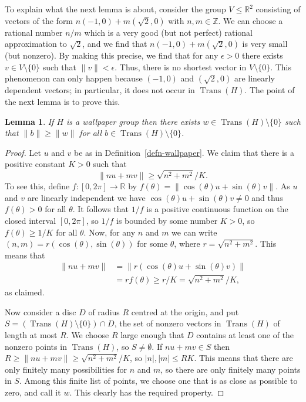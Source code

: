 \documentclass{amsart}
\DeclareMathOperator{\Trans}    {Trans}
\newcommand{\Z}         {{\mathbb{Z}}}
\newcommand{\R}         {{\mathbb{R}}}
\newcommand{\xra}       {\xrightarrow}
\newcommand{\sm}        {\setminus}
\newcommand{\ep}        {\epsilon}
\newcommand{\tht}       {\theta}
\renewcommand{\:}{\colon}
\newtheorem{lemma}[theorem]{Lemma}
\theoremstyle{definition}
\begin{document}
To explain what the next lemma is about, consider the group
$V\leq\R^2$ consisting of vectors of the form $n(-1,0)+m(\sqrt{2},0)$
with $n,m\in\Z$.  We can choose a rational number $n/m$ which is a
very good (but not perfect) rational approximation to $\sqrt{2}$, and
we find that $n(-1,0)+m(\sqrt{2},0)$ is very small (but nonzero).  By
making this precise, we find that for any $\ep>0$ there exists
$v\in V\sm\{0\}$ such that $\|v\|<\ep$.  Thus, there is no shortest
vector in $V\sm\{0\}$.  This phenomenon can only happen because
$(-1,0)$ and $(\sqrt{2},0)$ are linearly dependent vectors; in
particular, it does not occur in $\Trans(H)$.  The point of the next lemma
is to prove this.
\begin{lemma}\label{lem-discrete}
 If $H$ is a wallpaper group then there exists $w\in \Trans(H)\sm\{0\}$
 such that $\|b\|\geq\|w\|$ for all $b\in \Trans(H)\sm\{0\}$.
\end{lemma}
\begin{proof}
 Let $u$ and $v$ be as in Definition~\ref{defn-wallpaper}.  We claim
 that there is a positive constant $K>0$ such that 
 \[ \|nu+mv\| \geq \sqrt{n^2+m^2}/K. \]
 To see this, define
 $f\:[0,2\pi]\xra{}\R$ by $f(\theta)=\|\cos(\theta)u+\sin(\theta)v\|$.  As
 $u$ and $v$ are linearly independent we have
 $\cos(\theta)u+\sin(\theta)v\neq 0$ and thus $f(\theta)>0$ for all $\theta$.
 It follows that $1/f$ is a positive continuous function on the closed
 interval $[0,2\pi]$, so $1/f$ is bounded by some number $K>0$, so
 $f(\tht)\geq 1/K$ for all $\tht$.  Now, for any $n$ and $m$ we can
 write $(n,m)=r(\cos(\tht),\sin(\tht))$ for some $\tht$, where
 $r=\sqrt{n^2+m^2}$.  This means that
 \begin{align*}
  \|nu+mv\| &= \|r (\cos(\tht)u + \sin(\tht)v)\| \\
            &= r f(\tht) \geq r/K = \sqrt{n^2+m^2}/K,
 \end{align*}
 as claimed.
 
 Now consider a disc $D$ of radius $R$ centred at the origin, and put
 $S=(\Trans(H)\sm\{0\})\cap D$, the set of nonzero vectors in
 $\Trans(H)$ of length at most $R$.  We choose $R$ large enough that
 $D$ contains at least one of the nonzero points in $\Trans(H)$, so
 $S\neq\emptyset$.  If $nu+mv\in S$ then
 $R\geq\|nu+mv\|\geq\sqrt{n^2+m^2}/K$, so $|n|,|m|\leq RK$.  This
 means that there are only finitely many possibilities for $n$ and
 $m$, so there are only finitely many points in $S$.  Among this
 finite list of points, we choose one that is as close as possible to
 zero, and call it $w$.  This clearly has the required property.
\end{proof}
\end{document}
